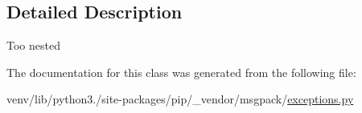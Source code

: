 \subsection{Detailed Description}
\begin{DoxyVerb}Too nested\end{DoxyVerb}
 

The documentation for this class was generated from the following file\+:\begin{DoxyCompactItemize}
\item 
venv/lib/python3./site-\/packages/pip/\+\_\+vendor/msgpack/\hyperlink{pip_2__vendor_2msgpack_2exceptions_8py}{exceptions.\+py}\end{DoxyCompactItemize}
